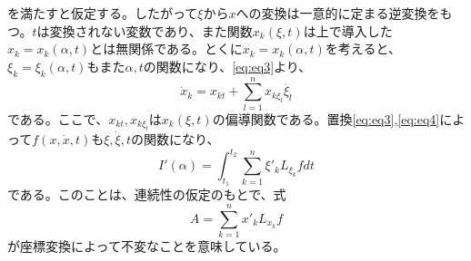 \documentclass[dvipdfmx, leqno]{jsbook}
\begin{document}
    を満たすと仮定する。したがって$\xi$から$x$への変換は一意的に定まる逆変換をもつ。$t$は変換されない変数であり、また関数$x_k(\xi,t)$は上で導入した$x_k= x_k(\alpha, t)$とは無関係である。とくに$x_k= x_k(\alpha, t)$を考えると、$\xi_k= \xi_k(\alpha, t)$もまた$\alpha, t$の関数になり、\eqref{eq:eq3}より、
\begin{equation} \label{eq:eq4}
    \dot{x}_k= x_{kt}+ \sum_{l= 1} ^n x_{k\xi_l}\dot{\xi_l}   
\end{equation}
    である。ここで、$x_{kt}, x_{k\xi_l}$は$x_k(\xi, t)$の偏導関数である。置換\eqref{eq:eq3},\eqref{eq:eq4}によって$f(x, \dot{x}, t)$も$\xi, \dot{\xi}, t$の関数になり、
\begin{equation}
    I'(\alpha)= \int_{t_1}^{t_2} \sum_{k= 1}^n \xi'_kL_{\xi_k}f dt
\end{equation}
    である。このことは、連続性の仮定のもとで、式
\begin{equation}
    A= \sum_{k= 1}^n x'_kL_{x_k}f
\end{equation}
    が座標変換によって不変なことを意味している。
\end{document}

